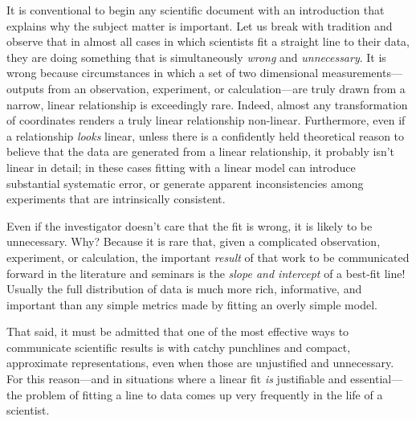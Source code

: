 \documentclass[12pt,twoside]{article}
\newcounter{problem}
\begin{document}
It is conventional to begin any scientific document with an
introduction that explains why the subject matter is important.  Let
us break with tradition and observe that in almost all cases in which
scientists fit a straight line to their data, they are doing something
that is simultaneously \emph{wrong} and \emph{unnecessary}.  It is
wrong because circumstances in which a set of two dimensional
measurements---outputs from an observation, experiment, or
calculation---are truly drawn from a narrow, linear relationship is
exceedingly rare.  Indeed, almost any transformation of coordinates
renders a truly linear relationship non-linear.  Furthermore, even if
a relationship \emph{looks} linear, unless there is a confidently held
theoretical reason to believe that the data are generated from a
linear relationship, it probably isn't linear in detail; in these
cases fitting with a linear model can introduce substantial systematic
error, or generate apparent inconsistencies among experiments that are
intrinsically consistent.

Even if the investigator doesn't care that the fit is wrong, it is
likely to be unnecessary.  Why?  Because it is rare that, given a
complicated observation, experiment, or calculation, the important
\emph{result} of that work to be communicated forward in the
literature and seminars is the \emph{slope and intercept} of a
best-fit line!  Usually the full distribution of data is much more
rich, informative, and important than any simple metrics made by
fitting an overly simple model.

That said, it must be admitted that one of the most effective ways to
communicate scientific results is with catchy punchlines and compact,
approximate representations, even when those are unjustified and
unnecessary.  For this reason---and in situations where a linear fit
\emph{is} justifiable and essential---the problem of fitting a line to
data comes up very frequently in the life of a scientist.
\end{document}
